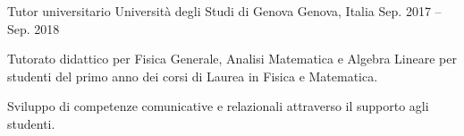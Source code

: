 \begin{cventries}

\cventry
{Tutor universitario} %
{Università degli Studi di Genova} %
{Genova, Italia} %
{Sep. 2017 -- Sep. 2018} %
{ %
\begin{cvitems}
\item {Tutorato didattico per Fisica Generale, Analisi Matematica e Algebra Lineare per studenti del primo anno dei corsi di Laurea in Fisica e Matematica.}
\item {Sviluppo di competenze comunicative e relazionali attraverso il supporto agli studenti.}
\end{cvitems}
}


\end{cventries}